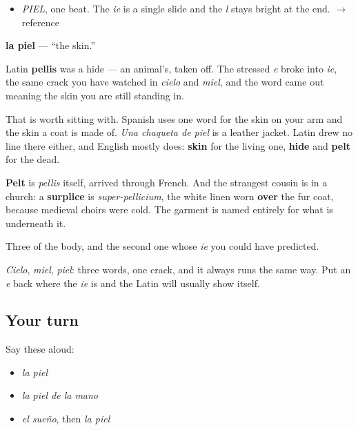 \begin{sounds}
\begin{itemize}
\raggedright
  \item \emph{PIEL}, one beat. The \emph{ie} is a single slide and the \emph{l} stays bright at the end. $\to$ reference
\end{itemize}
\end{sounds}

\begin{cousinweb}
\textbf{la piel} — \textquotedblleft{}the skin.\textquotedblright{}

Latin \textbf{pellis} was a hide — an animal's, taken off. The stressed \emph{e} broke into \emph{ie}, the same crack you have watched in \emph{cielo} and \emph{miel}, and the word came out meaning the skin you are still standing in.

That is worth sitting with. Spanish uses one word for the skin on your arm and the skin a coat is made of. \emph{Una chaqueta de piel} is a leather jacket. Latin drew no line there either, and English mostly does: \textbf{skin} for the living one, \textbf{hide} and \textbf{pelt} for the dead.

\textbf{Pelt} is \emph{pellis} itself, arrived through French. And the strangest cousin is in a church: a \textbf{surplice} is \emph{super-pellicium}, the white linen worn \textbf{over} the fur coat, because medieval choirs were cold. The garment is named entirely for what is underneath it.
\end{cousinweb}

\begin{grammarlens}[title={What you've built}]
Three of the body, and the second one whose \emph{ie} you could have predicted.

\emph{Cielo}, \emph{miel}, \emph{piel}: three words, one crack, and it always runs the same way. Put an \emph{e} back where the \emph{ie} is and the Latin will usually show itself.
\end{grammarlens}

\subsection*{Your turn}
Say these aloud:

\begin{itemize}
\raggedright
  \item \emph{la piel}
  \item \emph{la piel de la mano}
  \item \emph{el sueño}, then \emph{la piel}
\end{itemize}

